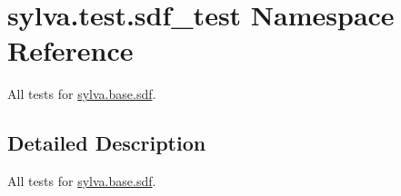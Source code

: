 \hypertarget{namespacesylva_1_1test_1_1sdf__test}{}\section{sylva.\+test.\+sdf\+\_\+test Namespace Reference}
\label{namespacesylva_1_1test_1_1sdf__test}


All tests for \hyperlink{namespacesylva_1_1base_1_1sdf}{sylva.\+base.\+sdf}.  




\subsection{Detailed Description}
All tests for \hyperlink{namespacesylva_1_1base_1_1sdf}{sylva.\+base.\+sdf}. 